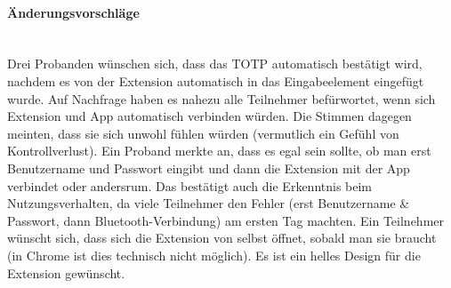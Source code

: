 \paragraph*{Änderungsvorschläge}
\mbox{} \vspace{0.1cm} \\
Drei Probanden wünschen sich, dass das TOTP automatisch bestätigt wird, nachdem es 
von der Extension automatisch in das Eingabeelement eingefügt wurde. Auf Nachfrage 
haben es nahezu alle Teilnehmer befürwortet, wenn sich Extension und App 
automatisch verbinden würden. Die Stimmen dagegen meinten, dass sie sich unwohl 
fühlen würden (vermutlich ein Gefühl von Kontrollverlust). Ein Proband merkte an, 
dass es egal sein sollte, ob man erst Benutzername und Passwort eingibt und dann 
die Extension mit der App verbindet oder andersrum. Das bestätigt auch die 
Erkenntnis beim Nutzungsverhalten, da viele Teilnehmer den Fehler (erst 
Benutzername \& Passwort, dann Bluetooth-Verbindung) am ersten Tag machten. Ein 
Teilnehmer wünscht sich, dass sich die Extension von selbst öffnet, sobald man sie 
braucht (in Chrome ist dies technisch nicht möglich). Es ist ein helles Design für 
die Extension gewünscht.